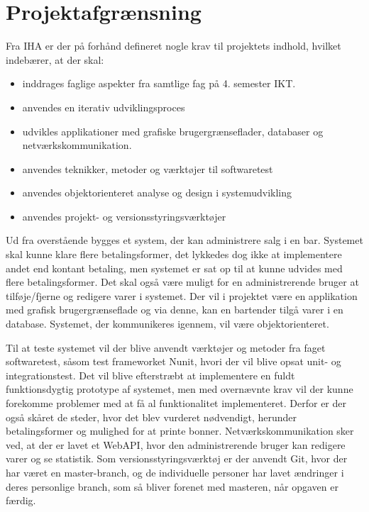 \chapter{Projektafgrænsning}
Fra \gls{IHA}  er der på forhånd defineret nogle krav til projektets indhold, hvilket indebærer, at der skal:
\begin{itemize}
\item inddrages faglige aspekter fra samtlige fag på 4. semester IKT. 
\item anvendes en iterativ udviklingsproces
\item udvikles applikationer med grafiske brugergrænseflader, databaser og
netværkskommunikation.
\item anvendes teknikker, metoder og værktøjer til softwaretest
\item anvendes objektorienteret analyse og design i systemudvikling
\item anvendes projekt- og versionsstyringsværktøjer
\newline\newline
\end{itemize}

Ud fra overstående bygges et system, der kan administrere salg i en bar. 
Systemet skal kunne klare flere betalingsformer, det lykkedes dog ikke at implementere andet end kontant betaling, men systemet er sat op til at kunne udvides med flere betalingsformer. 
Det skal også være muligt for en administrerende bruger at tilføje/fjerne og redigere varer i systemet.  
\newline\newline
Der vil i projektet være en applikation med grafisk brugergrænseflade og via denne, kan en bartender tilgå varer i en database. Systemet, der kommunikeres igennem, vil være objektorienteret. 

Til at teste systemet vil der blive anvendt værktøjer og metoder fra faget softwaretest, såsom test frameworket Nunit, hvori der vil blive opsat unit- og integrationstest. 
\newline\newline
Det vil blive efterstræbt at implementere en fuldt funktionsdygtig prototype af systemet, 
men med overnævnte krav vil der kunne forekomme problemer med at få al funktionalitet implementeret. 
Derfor er der også skåret de steder, hvor det blev vurderet nødvendigt, herunder betalingsformer og mulighed for at printe bonner.
\newline\newline
Netværkskommunikation sker ved, at der er lavet et \gls{WebAPI}, hvor den administrerende bruger kan redigere varer og se statistik.  
\newline\newline
Som versionsstyringsværktøj er der anvendt Git, hvor der har været en master-branch, og de individuelle personer har lavet ændringer i deres personlige branch, som så bliver forenet med masteren, når opgaven er færdig.  
